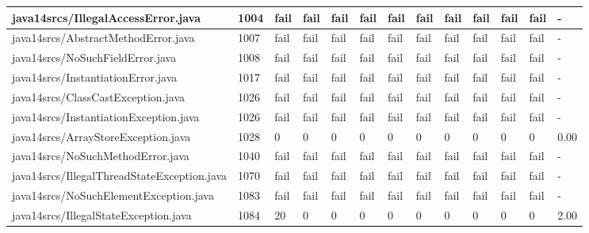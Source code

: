 \begin{tabular}{|l|l|l|l|l|l|l|l|l|l|l|l|l|}
\hline
java14srcs/IllegalAccessError.java                 & 1004        & fail      & fail      & fail      & fail      & fail      & fail      & fail      & fail      & fail      & fail      & -         \\
\hline
java14srcs/AbstractMethodError.java                & 1007        & fail      & fail      & fail      & fail      & fail      & fail      & fail      & fail      & fail      & fail      & -         \\
\hline
java14srcs/NoSuchFieldError.java                   & 1008        & fail      & fail      & fail      & fail      & fail      & fail      & fail      & fail      & fail      & fail      & -         \\
\hline
java14srcs/InstantiationError.java                 & 1017        & fail      & fail      & fail      & fail      & fail      & fail      & fail      & fail      & fail      & fail      & -         \\
\hline
java14srcs/ClassCastException.java                 & 1026        & fail      & fail      & fail      & fail      & fail      & fail      & fail      & fail      & fail      & fail      & -         \\
\hline
java14srcs/InstantiationException.java             & 1026        & fail      & fail      & fail      & fail      & fail      & fail      & fail      & fail      & fail      & fail      & -         \\
\hline
java14srcs/ArrayStoreException.java                & 1028        & 0         & 0         & 0         & 0         & 0         & 0         & 0         & 0         & 0         & 0         & 0.00      \\
\hline
java14srcs/NoSuchMethodError.java                  & 1040        & fail      & fail      & fail      & fail      & fail      & fail      & fail      & fail      & fail      & fail      & -         \\
\hline
java14srcs/IllegalThreadStateException.java        & 1070        & fail      & fail      & fail      & fail      & fail      & fail      & fail      & fail      & fail      & fail      & -         \\
\hline
java14srcs/NoSuchElementException.java             & 1083        & fail      & fail      & fail      & fail      & fail      & fail      & fail      & fail      & fail      & fail      & -         \\
\hline
java14srcs/IllegalStateException.java              & 1084        & 20        & 0         & 0         & 0         & 0         & 0         & 0         & 0         & 0         & 0         & 2.00      \\

\end{tabular}
